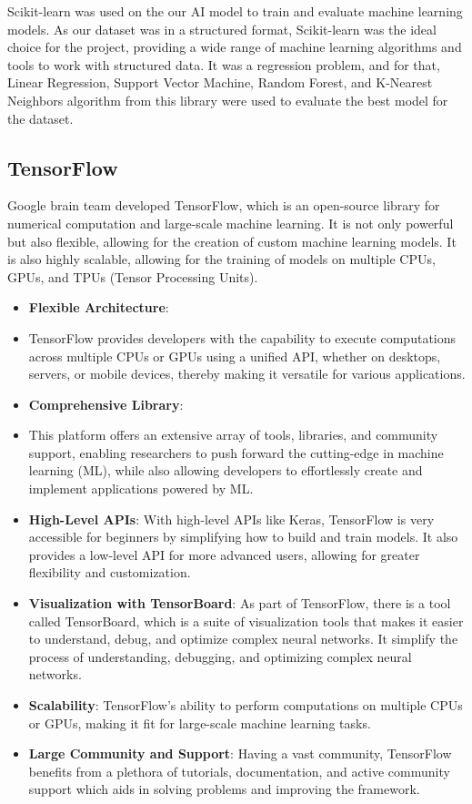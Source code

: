Scikit-learn was used on the our AI model to train and evaluate machine learning models. As our dataset was in a structured format, Scikit-learn was the ideal choice for the project, 
providing a wide range of machine learning algorithms and tools to work with structured data. It was a regression problem, and for that, Linear Regression, Support Vector Machine,
Random Forest, and K-Nearest Neighbors algorithm from this library were used to evaluate the best model for the dataset.

\subsection{TensorFlow}

Google brain team developed TensorFlow, which is an open-source library for numerical computation and large-scale machine learning.  It is not only powerful but also flexible, allowing for 
the creation of custom machine learning models. It is also highly scalable, allowing for the training of models on multiple CPUs, GPUs, and TPUs (Tensor Processing Units).\cite{tensorflow}

\begin{itemize}
    \item \textbf{Flexible Architecture}: 
    \item 
    TensorFlow provides developers with the capability to execute computations across multiple CPUs or GPUs using a unified API, whether on desktops, servers, or mobile devices, thereby making it versatile for various applications.
    \item \textbf{Comprehensive Library}: 
    \item This platform offers an extensive array of tools, libraries, and community support, enabling researchers to push forward the cutting-edge in machine learning (ML), while also allowing developers to effortlessly create and implement applications powered by ML.
    \item \textbf{High-Level APIs}: With high-level APIs like Keras, TensorFlow is very accessible for beginners by simplifying how to build and train models. It also provides a low-level API for more advanced users, allowing for greater flexibility and customization.
    \item \textbf{Visualization with TensorBoard}: As part of TensorFlow, there is a tool called TensorBoard, which is a suite of visualization tools that makes it easier to understand, debug, 
    and optimize complex neural networks. It simplify the process of understanding, debugging, and optimizing complex neural networks.
    \item \textbf{Scalability}: TensorFlow's ability to perform computations on multiple CPUs or GPUs, making it fit for large-scale machine learning tasks.
    \item \textbf{Large Community and Support}: Having a vast community, TensorFlow benefits from a plethora of tutorials, documentation, and active community support which aids in solving problems and improving the framework.
\end{itemize}

